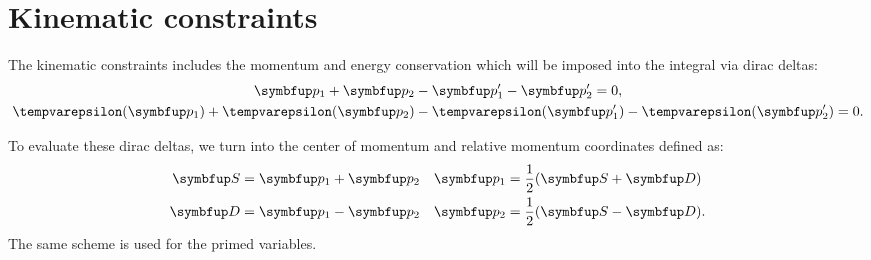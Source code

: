 \section{Kinematic constraints}

The kinematic constraints includes the momentum and energy conservation which will be imposed into the integral via dirac deltas:
\begin{gather}
  \vv{p}_1 + \vv{p}_2 - \vv{p}_1' - \vv{p}_2' = 0, \\
  \epsilon(\vv{p}_1) + \epsilon(\vv{p}_2) - \epsilon(\vv{p}_1') - \epsilon(\vv{p}_2') = 0.
\end{gather}

To evaluate these dirac deltas, we turn into the center of momentum and relative momentum coordinates defined as:
\begin{align}
  \vv{S} & = \vv{p}_1 + \vv{p}_2 & \vv{p}_1 & = \frac{1}{2}(\vv{S}+ \vv{D})   \\
  \vv{D} & = \vv{p}_1 - \vv{p}_2 & \vv{p}_2 & = \frac{1}{2}(\vv{S} - \vv{D}).
\end{align}
The same scheme is used for the primed variables.

